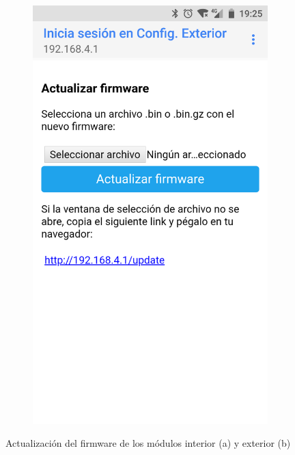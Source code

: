 \begin{figure}
\begin{subfigure}{0.49\columnwidth}
\end{subfigure}
\hfill
\begin{subfigure}{0.49\columnwidth}
  \centering
  \includegraphics[width=1\columnwidth,frame]{images/exterior-firmware-update}
  \caption{}
  \label{fig:exterior-firmware-update}
\end{subfigure}
\caption{Actualización del firmware de los módulos interior (a) y exterior (b)}
\label{fig:firmware-update}
\end{figure}

